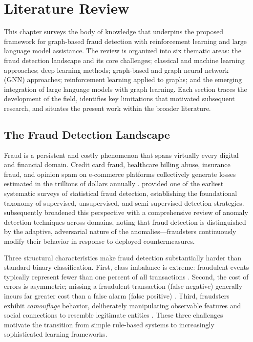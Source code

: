 \chapter{Literature Review}

This chapter surveys the body of knowledge that underpins the proposed framework for
graph-based fraud detection with reinforcement learning and large language model
assistance. The review is organized into six thematic areas: the fraud detection
landscape and its core challenges; classical and machine learning approaches; deep
learning methods; graph-based and graph neural network (GNN) approaches; reinforcement
learning applied to graphs; and the emerging integration of large language models with
graph learning. Each section traces the development of the field, identifies key
limitations that motivated subsequent research, and situates the present work within the
broader literature.

\section{The Fraud Detection Landscape}

Fraud is a persistent and costly phenomenon that spans virtually every digital and
financial domain. Credit card fraud, healthcare billing abuse, insurance fraud, and
opinion spam on e-commerce platforms collectively generate losses estimated in the
trillions of dollars annually \cite{ngai2011application}.
\cite{bolton2002statistical} provided one of the earliest systematic surveys of
statistical fraud detection, establishing the foundational taxonomy of supervised,
unsupervised, and semi-supervised detection strategies. \cite{chandola2009anomaly}
subsequently broadened this perspective with a comprehensive review of anomaly detection
techniques across domains, noting that fraud detection is distinguished by the adaptive,
adversarial nature of the anomalies—fraudsters continuously modify their behavior in
response to deployed countermeasures.

Three structural characteristics make fraud detection substantially harder than standard
binary classification. First, class imbalance is extreme: fraudulent events typically
represent fewer than one percent of all transactions \cite{dalpozzolo2015calibrating}.
Second, the cost of errors is asymmetric; missing a fraudulent transaction (false
negative) generally incurs far greater cost than a false alarm (false positive)
\cite{baesens2015fraud}. Third, fraudsters exhibit \emph{camouflage} behavior,
deliberately manipulating observable features and social connections to resemble
legitimate entities \cite{dou2020enhancing}. These three challenges motivate the
transition from simple rule-based systems to increasingly sophisticated learning
frameworks.

